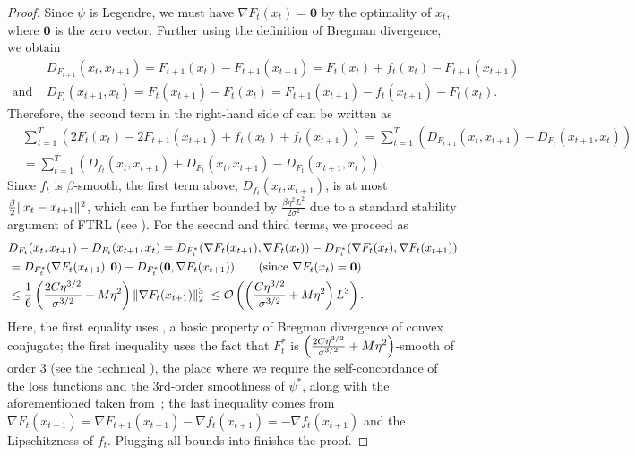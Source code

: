 \begin{proof}
Since $\psi$ is Legendre, we must have $\nabla F_t(x_t) = \mathbf{0}$ by the optimality of $x_t$, where $\mathbf{0}$ is the zero vector.
Further using the definition of Bregman divergence, we obtain
\begin{align*}
    &D_{F_{t+1}}(x_t,x_{t+1})
    = F_{t+1}(x_t) - F_{t+1}(x_{t+1})
    = F_t(x_t) + f_t(x_t) - F_{t+1}(x_{t+1})\\
    \text{and }&D_{F_{t}}(x_{t+1},x_{t})
    = F_t(x_{t+1}) - F_t(x_t) 
    = F_{t+1}(x_{t+1}) - f_t(x_{t+1}) - F_{t}(x_{t}).
\end{align*}
Therefore, the second term in the right-hand side of  can be written as
\begin{align*}
    &\sum_{t=1}^T\left(2F_t(x_t)-2F_{t+1}(x_{t+1})+f_t(x_t)+f_t(x_{t+1})\right)
    = \sum_{t=1}^T\left(D_{F_{t+1}}(x_t,x_{t+1}) - D_{F_t}(x_{t+1},x_t)\right) \\
    &=\sum_{t=1}^T\left(D_{f_t}(x_t,x_{t+1})+D_{F_{t}}(x_t,x_{t+1}) - D_{F_t}(x_{t+1},x_t)\right).
\end{align*}
Since $f_t$ is $\beta$-smooth, the first term above, $D_{f_t}(x_t,x_{t+1})$, is at most $\frac{\beta}{2}\lVert x_t-x_{t+1}\rVert^2$,
which can be further bounded by $\frac{\beta\eta^2L^2}{2\sigma^2}$ due to a standard stability argument of FTRL (see ). For the second and third terms, we proceed as
\begin{align*}
    &D_{F_t}(x_t,x_{t+1}) - D_{F_t}(x_{t+1},x_t) 
    =  D_{{F}_t^*}(\nabla {F}_t(x_{t+1}),\nabla {F}_t(x_{t}))- D_{{F}_t^*}(\nabla {F}_t(x_{t}),\nabla {F}_t(x_{t+1})) \\
    &=  D_{{F}_t^*}(\nabla {F}_t(x_{t+1}),\mathbf{0}) - D_{{F}_t^*}(\mathbf{0},\nabla {F}_t(x_{t+1})) \tag{since $\nabla {F}_t(x_{t}) = \mathbf{0}$} \\
    &\leq \frac{1}{6}\rbr{\frac{2C\eta^{3/2}}{\sigma^{3/2}}+M\eta^2}\norm{\nabla {F}_t(x_{t+1})}_2^3 ~%
    \le \order\rbr{\rbr{\frac{C\eta^{3/2}}{\sigma^{3/2}}+M\eta^2} L^3}.
\end{align*}
Here, the first equality uses , a basic property of Bregman divergence of convex conjugate;
the first inequality uses the fact that ${F}_t^*$ is $\left(\frac{2C\eta^{3/2}}{\sigma^{3/2}}+M\eta^2\right)$-smooth of order $3$ (see the technical ), the place where we require the self-concordance of the loss functions and the 3rd-order smoothness of $\psi^*$,
along with the aforementioned  taken from~\citet{wibisono2022alternating};
the last inequality comes from $\nabla F_t(x_{t+1})=\nabla {F}_{t+1}(x_{t+1}) - \nabla f_{t}(x_{t+1})=- \nabla f_{t}(x_{t+1})$ and the Lipschitzness of $f_{t}$.
Plugging all bounds into  finishes the proof.
% 
\end{proof}

